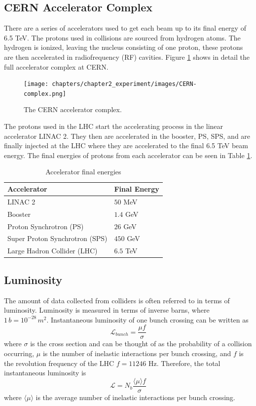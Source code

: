 	\subsection{CERN Accelerator Complex}
		There are a series of accelerators used to get each beam up to its final energy of 6.5 TeV. The protons used in collisions are sourced from hydrogen atoms. The hydrogen is ionized, leaving the nucleus consisting of one proton, these protons are then accelerated in radiofrequency (RF) cavities. Figure \ref{fig:CERN-complex} shows in detail the full accelerator complex at CERN. 
		\begin{figure}[!ht]
		\centering
		\texttt{[image: chapters/chapter2\_experiment/images/CERN-complex.png]}
		\caption{The CERN accelerator complex. \cite{CERN-complex}}
		\label{fig:CERN-complex}
		\end{figure}
		The protons used in the LHC start the accelerating process in the linear accelerator LINAC 2. They then are accelerated in the booster, PS, SPS, and are finally injected at the LHC where they are accelerated to the final 6.5 TeV beam energy. The final energies of protons from each accelerator can be seen in Table \ref{tab:accelerator-complex}.
		\begin{table}[!thp]
			\centering
			\caption{Accelerator final energies}
			\begin{tabular}{| l | l |}  
			\hline
			Accelerator 					& Final Energy 	\\ \hline
			\hline
			LINAC 2 						& $50$ MeV 		\\ 	\hline
			Booster 						& $1.4$ GeV 	\\ 	\hline
			Proton Synchrotron (PS)			& $26$ GeV 		\\ 	\hline
			Super Proton Synchrotron (SPS) 	& $450$ GeV 	\\ 	\hline
			Large Hadron Collider (LHC)		& $6.5$ TeV 	\\ 	\hline
			\end{tabular}
			\label{tab:accelerator-complex}
		\end{table}

	\subsection{Luminosity}
		The amount of data collected from colliders is often referred to in terms of luminosity. Luminosity is measured in terms of inverse barns, where $1 \, b = 10^{-28} \, m^2$. Instantaneous luminosity of one bunch crossing can be written as 
		\begin{equation}\label{eqn:bunch-lumi}
		\mathcal{L}_{bunch} = \frac{ \mu  f }{\sigma}
		\end{equation}
		where $\sigma$ is the cross section and can be thought of as the probability of a collision occurring, $\mu$ is the number of inelastic interactions per bunch crossing, and $f$ is the revolution frequency of the LHC $f=11246$ Hz. Therefore, the total instantaneous luminosity is 
		\begin{equation}\label{eqn:tot-inst-lumi}
		\mathcal{L} = N_b \frac{ \langle \mu \rangle f}{\sigma}
		\end{equation}
		where $\langle \mu \rangle$ is the average number of inelastic interactions per bunch crossing. 

